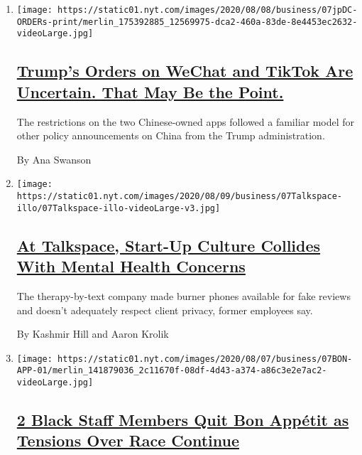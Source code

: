 \begin{enumerate}
\def\labelenumi{\arabic{enumi}.}
\item
  \texttt{[image: https://static01.nyt.com/images/2020/08/08/business/07jpDC-ORDERs-print/merlin\_175392885\_12569975-dca2-460a-83de-8e4453ec2632-videoLarge.jpg]}

  \hypertarget{trumps-orders-on-wechat-and-tiktok-are-uncertain-that-may-be-the-point}{%
  \subsection{\texorpdfstring{\href{/2020/08/07/business/economy/trump-executive-order-tiktok-wechat.html}{Trump's
  Orders on WeChat and TikTok Are Uncertain. That May Be the
  Point.}}{Trump's Orders on WeChat and TikTok Are Uncertain. That May Be the Point.}}\label{trumps-orders-on-wechat-and-tiktok-are-uncertain-that-may-be-the-point}}

  The restrictions on the two Chinese-owned apps followed a familiar
  model for other policy announcements on China from the Trump
  administration.

  By Ana Swanson
\item
  \texttt{[image: https://static01.nyt.com/images/2020/08/09/business/07Talkspace-illo/07Talkspace-illo-videoLarge-v3.jpg]}

  \hypertarget{at-talkspace-start-up-culture-collides-with-mental-health-concerns}{%
  \subsection{\texorpdfstring{\href{/2020/08/07/technology/talkspace.html}{At
  Talkspace, Start-Up Culture Collides With Mental Health
  Concerns}}{At Talkspace, Start-Up Culture Collides With Mental Health Concerns}}\label{at-talkspace-start-up-culture-collides-with-mental-health-concerns}}

  The therapy-by-text company made burner phones available for fake
  reviews and doesn't adequately respect client privacy, former
  employees say.

  By Kashmir Hill and Aaron Krolik
\item
  \texttt{[image: https://static01.nyt.com/images/2020/08/07/business/07BON-APP-01/merlin\_141879036\_2c11670f-08df-4d43-a374-a86c3e2e7ac2-videoLarge.jpg]}

  \hypertarget{2-black-staff-members-quit-bon-appuxe9tit-as-tensions-over-race-continue}{%
  \subsection{\texorpdfstring{\href{/2020/08/07/business/media/bon-appetit-race-black-staff-quits.html}{2
  Black Staff Members Quit Bon Appétit as Tensions Over Race
  Continue}}{2 Black Staff Members Quit Bon Appétit as Tensions Over Race Continue}}\label{2-black-staff-members-quit-bon-appuxe9tit-as-tensions-over-race-continue}}


\end{enumerate}
